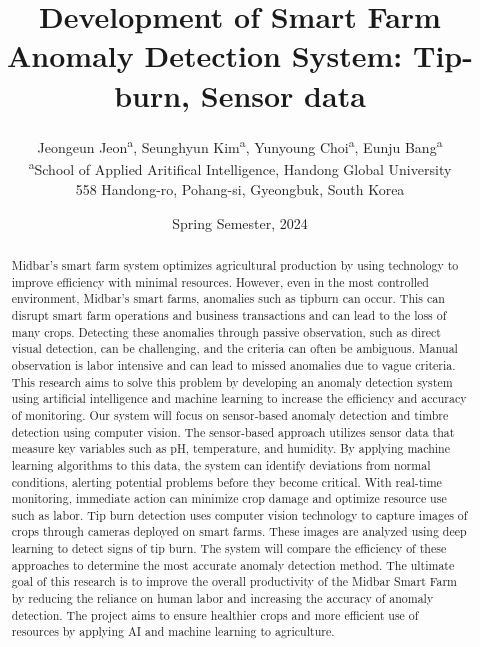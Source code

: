 \documentclass[11pt]{article}
\begin{document}
           

    \title{Development of Smart Farm Anomaly Detection System: Tip-burn, Sensor data}          
    \author{Jeongeun Jeon\textsuperscript{a},
        Seunghyun Kim\textsuperscript{a},
        Yunyoung Choi\textsuperscript{a},
        Eunju Bang\textsuperscript{a}\\
    {\small \textsuperscript{a}School of Applied Aritifical Intelligence, Handong Global University}\\
    {\small 558 Handong-ro, Pohang-si, Gyeongbuk, South Korea}\\
        }

    \date{Spring Semester, 2024}      

    \maketitle                 
 
    \begin{abstract}
        \paragraph{} Midbar's smart farm system optimizes agricultural production by using technology to improve efficiency with minimal resources. However, even in the most controlled environment, Midbar's smart farms, anomalies such as tipburn can occur. This can disrupt smart farm operations and business transactions and can lead to the loss of many crops. Detecting these anomalies through passive observation, such as direct visual detection, can be challenging, and the criteria can often be ambiguous. Manual observation is labor intensive and can lead to missed anomalies due to vague criteria. 
        This research aims to solve this problem by developing an anomaly detection system using artificial intelligence and machine learning to increase the efficiency and accuracy of monitoring. Our system will focus on sensor-based anomaly detection and timbre detection using computer vision.
        The sensor-based approach utilizes sensor data that measure key variables such as pH, temperature, and humidity. By applying machine learning algorithms to this data, the system can identify deviations from normal conditions, alerting potential problems before they become critical. With real-time monitoring, immediate action can minimize crop damage and optimize resource use such as labor.
        Tip burn detection uses computer vision technology to capture images of crops through cameras deployed on smart farms. These images are analyzed using deep learning to detect signs of tip burn. The system will compare the efficiency of these approaches to determine the most accurate anomaly detection method.
        The ultimate goal of this research is to improve the overall productivity of the Midbar Smart Farm by reducing the reliance on human labor and increasing the accuracy of anomaly detection. The project aims to ensure healthier crops and more efficient use of resources by applying AI and machine learning to agriculture.


    \end{abstract}
    
\end{document}

